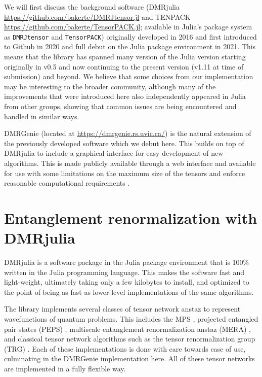 \documentclass{juliacon}
\begin{document}
We will first discuss the background software (DMRjulia \url{https://github.com/bakerte/DMRJtensor.jl} and TENPACK \url{https://github.com/bakerte/TensorPACK.jl}; available in Julia's package system as {\tt DMRJtensor} and {\tt TensorPACK}) originally developed in 2016 and first introduced to Github in 2020 and full debut on the Julia package environment in 2021. This means that the library has spanned many version of the Julia version starting originally in v0.5 and now continuing to the present version (v1.11 at time of submission) and beyond. We believe that some choices from our implementation may be interesting to the broader community, although many of the improvements that were introduced here also independently appeared in Julia from other groups, showing that common issues are being encountered and handled in similar ways.

DMRGenie (located at \url{https://dmrgenie.rs.uvic.ca/}) is the natural extension of the previously developed software which we debut here. This builds on top of DMRjulia to include a graphical interface for easy development of new algorithms. This is made publicly available through a web interface and available for use with some limitations on the maximum size of the tensors and enforce reasonable computational requirements \cite{dmrgenie}.



\section{Entanglement renormalization with DMRjulia}

DMRjulia is a software package in the Julia package environment that is 100\% written in the Julia programming language. This makes the software fast and light-weight, ultimately taking only a few kilobytes to install, and optimized to the point of being as fast as lower-level implementations of the same algorithms.

The library implements several classes of tensor network anstaz to represent wavefunctions of quantum problems. This includes the MPS \cite{verstraete2006matrix,baker2024bundled}, projected entangled pair states (PEPS) \cite{verstraete2004renormalization}, multiscale entanglement renormalization anstaz (MERA) \cite{vidal2007entanglement}, and classical tensor network algorithms such as the tensor renormalization group (TRG) \cite{levin2007tensor}. Each of these implementations is done with care towards ease of use, culminating in the DMRGenie implementation here.  All of these tensor networks are implemented in a fully flexible way.
\end{document}
